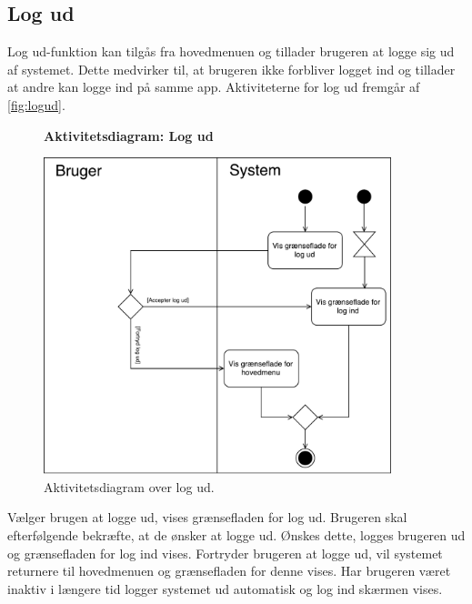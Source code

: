 \subsection*{Log ud}
Log ud-funktion kan tilgås fra hovedmenuen og tillader brugeren at logge sig ud af systemet. Dette medvirker til, at brugeren ikke forbliver logget ind og tillader at andre  kan logge ind på samme app.
Aktiviteterne for log ud fremgår af \autoref{fig:logud}.

\begin{figure} [H]
\centering
\textbf{Aktivitetsdiagram: Log ud}\par\medskip
\includegraphics[width=0.9\textwidth]{figures/aktivitetsdiagram/Logud}
\caption{Aktivitetsdiagram over log ud.}
\label{fig:logud}
\end{figure}

\noindent
Vælger brugen at logge ud, vises grænsefladen for log ud. 
Brugeren skal efterfølgende bekræfte, at de ønsker at logge ud. Ønskes dette, logges brugeren ud og grænsefladen for log ind vises. Fortryder brugeren at logge ud, vil systemet returnere til hovedmenuen og grænsefladen for denne vises. Har brugeren været inaktiv i længere tid logger systemet ud automatisk og log ind skærmen vises. 